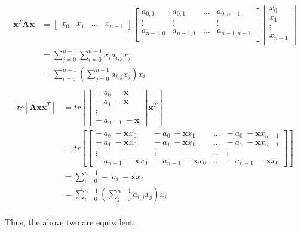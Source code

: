 \documentclass[11pt]{article}
\begin{document}
\begin{equation}
\begin{split}
\pmb{x}^T\pmb{Ax} &=\begin{bmatrix}
x_0 & x_1 & ... & x_{n-1}
\end{bmatrix}\begin{bmatrix}
a_{0,0} & a_{0,1} & ... & a_{0,n-1}\\
\vdots  &	\vdots & 	&	\vdots \\
a_{n-1,0}&	a_{n-1,1} & ... & a_{n-1, n-1}\\
\end{bmatrix}\begin{bmatrix}
x_0\\
x_1\\
\vdots\\
x_{n-1}\\
\end{bmatrix}\\
&=\sum_{j=0}^{n-1}\sum_{i=0}^{n-1}x_ia_{i,j}x_j\\
&=\sum_{i=0}^{n-1}\left(\sum_{j=0}^{n-1}a_{i,j}x_j\right)x_i\\
\end{split}
\end{equation}
\begin{equation}
\begin{split}
tr\left[\pmb{Axx}^T\right]&=tr\left[\begin{bmatrix}
-\ a_0\ -\pmb{x} \\
-\ a_1\ -\pmb{x} \\
\vdots \\
-\ a_{n-1}\ -\pmb{x}
\end{bmatrix}\pmb{x}^T\right]\\
&=tr\left[\begin{bmatrix}
-\ a_0\ -\pmb{x}x_{0} & -\ a_0\ -\pmb{x}x_1 & ... & -\ a_0\ -\pmb{x}x_{n-1} \\
-\ a_1\ -\pmb{x}x_{0} & -\ a_1\ -\pmb{x}x_1 & ... & -\ a_1\ -\pmb{x}x_{n-1}\\
\vdots & \vdots & ... & \vdots \\
-\ a_{n-1}\ -\pmb{x}x_{0} & -\ a_{n-1}\ -\pmb{x}x_{0} & ... & -\ a_{n-1}\ -\pmb{x}x_{0}
\end{bmatrix}\right]\\
&=\sum_{i=0}^{n-1}-\ a_i\ -\pmb{x}x_i\\
&=\sum_{i=0}^{n-1}\left(\sum_{j=0}^{n-1}a_{i,j}x_j\right)x_i
\end{split}
\end{equation}\\
Thus, the above two are equivalent.
\pagebreak
\end{document}
